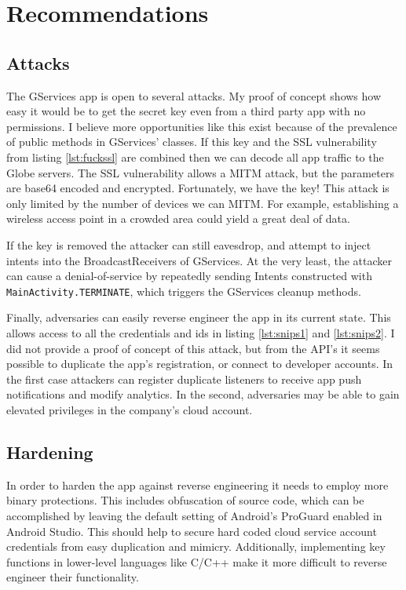 \documentclass[conference,compsoc]{IEEEtran}
\begin{document}
\section{Recommendations}

\subsection{Attacks}
The GServices app is open to several attacks. My proof of concept shows how easy it would be to get the secret key even from a third party app with no permissions. I believe more opportunities like this exist because of the prevalence of public methods in GServices' classes. If this key and the SSL vulnerability from listing \ref{lst:fuckssl} are combined then we can decode all app traffic to the Globe servers. The SSL vulnerability allows a MITM attack, but the parameters are base64 encoded and encrypted. Fortunately, we have the key! This attack is only limited by the number of devices we can MITM. For example, establishing a wireless access point in a crowded area could yield a great deal of data.

If the key is removed the attacker can still eavesdrop, and attempt to inject intents into the BroadcastReceivers of GServices. At the very least, the attacker can cause a denial-of-service by repeatedly sending Intents constructed with \texttt{MainActivity.TERMINATE}, which triggers the GServices cleanup methods.

Finally, adversaries can easily reverse engineer the app in its current state. This allows access to all the credentials and ids in listing \ref{lst:snips1} and \ref{lst:snips2}. I did not provide a proof of concept of this attack, but from the API's it seems possible to duplicate the app's registration, or connect to developer accounts. In the first case attackers can register duplicate listeners to receive app push notifications and modify analytics. In the second, adversaries may be able to gain elevated privileges in the company's cloud account.

\subsection{Hardening}
In order to harden the app against reverse engineering it needs to employ more binary protections. This includes obfuscation of source code, which can be accomplished by leaving the default setting of Android's ProGuard enabled in Android Studio. This should help to secure hard coded cloud service account credentials from easy duplication and mimicry. Additionally, implementing key functions in lower-level languages like C/C++ make it more difficult to reverse engineer their functionality.
\end{document}
